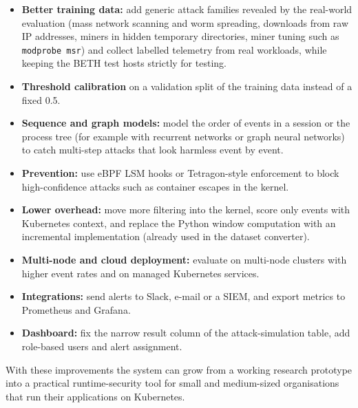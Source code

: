\begin{itemize}
    \item \textbf{Better training data:} add generic attack families revealed by the
          real-world evaluation (mass network scanning and worm spreading, downloads from
          raw IP addresses, miners in hidden temporary directories, miner tuning such as
          \texttt{modprobe msr}) and collect labelled telemetry from real workloads, while
          keeping the BETH test hosts strictly for testing.
    \item \textbf{Threshold calibration} on a validation split of the training data
          instead of a fixed 0.5.
    \item \textbf{Sequence and graph models:} model the order of events in a session or the
          process tree (for example with recurrent networks or graph neural networks) to
          catch multi-step attacks that look harmless event by event.
    \item \textbf{Prevention:} use eBPF LSM hooks or Tetragon-style enforcement to block
          high-confidence attacks such as container escapes in the kernel.
    \item \textbf{Lower overhead:} move more filtering into the kernel, score only events
          with Kubernetes context, and replace the Python window computation with an
          incremental implementation (already used in the dataset converter).
    \item \textbf{Multi-node and cloud deployment:} evaluate on multi-node clusters with
          higher event rates and on managed Kubernetes services.
    \item \textbf{Integrations:} send alerts to Slack, e-mail or a SIEM, and export metrics
          to Prometheus and Grafana.
    \item \textbf{Dashboard:} fix the narrow result column of the attack-simulation table,
          add role-based users and alert assignment.
\end{itemize}

With these improvements the system can grow from a working research prototype into a
practical runtime-security tool for small and medium-sized organisations that run
their applications on Kubernetes.
